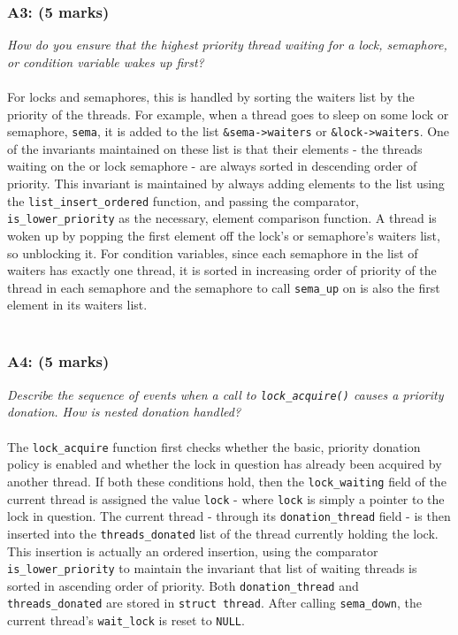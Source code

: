 \documentclass{article}
\begin{document}
\subsubsection*{A3: (5 marks) }
\textit{How do you ensure that the highest priority thread waiting for a lock, semaphore, or condition variable wakes up first?}
\\ \\
For locks and semaphores, this is handled by sorting the waiters list by the priority of the threads. For example, when a thread goes to sleep on some lock or semaphore, \texttt{sema}, it is added to the list \texttt{\&sema->waiters} or \texttt{\&lock->waiters}. One of the invariants maintained on these list is that their elements - the threads waiting on the or lock semaphore - are always sorted in descending order of priority. This invariant is maintained by always adding elements to the list using the \texttt{list\_insert\_ordered} function, and passing the comparator, \texttt{is\_lower\_priority} as the necessary, element comparison function. A thread is woken up by popping the first element off the lock's or semaphore's waiters list, so unblocking it. For condition variables, since each semaphore in the list of waiters has exactly one thread, it is sorted in increasing order of priority of the thread in each semaphore and the semaphore to call \texttt{sema\_up} on is also the first element in its waiters list.
\\ \\

\subsubsection*{A4: (5 marks) }
\textit{Describe the sequence of events when a call to \texttt{lock\_acquire()} causes a priority donation. How is nested donation handled?}
\\ \\
The \texttt{lock\_acquire} function first checks whether the basic, priority donation policy is enabled and whether the lock in question has already been acquired by another thread. If both these conditions hold, then the \texttt{lock\_waiting} field of the current thread is assigned the value \texttt{lock} - where \texttt{lock} is simply a pointer to the lock in question. The current thread - through its \texttt{donation\_thread} field - is then inserted into the \texttt{threads\_donated} list of the thread currently holding the lock. This insertion is actually an ordered insertion, using the comparator \texttt{is\_lower\_priority} to maintain the invariant that list of waiting threads is sorted in ascending order of priority. Both \texttt{donation\_thread} and \texttt{threads\_donated} are stored in \texttt{struct thread}.
After calling \texttt{sema\_down}, the current thread's \texttt{wait\_lock} is reset to \texttt{NULL}.
\\ \\
\end{document}
